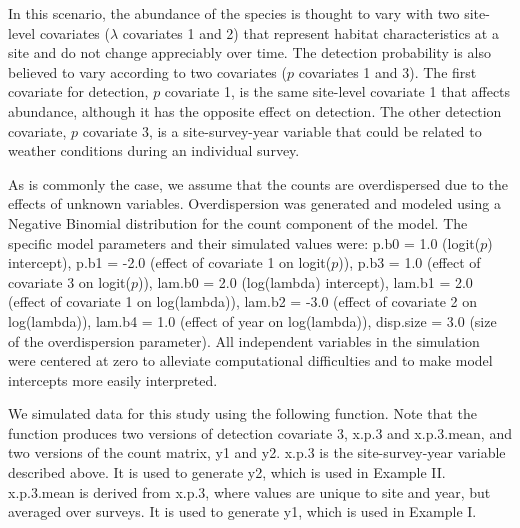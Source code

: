 \documentclass[article]{jss}
\begin{document}
In this scenario, the abundance of the species is thought to vary with two site-level covariates ($\lambda$ covariates 1 and 2) that represent habitat characteristics at a site and do not change appreciably over time. The detection probability is also believed to vary according to two covariates ($p$ covariates 1 and 3). The first covariate for detection, $p$ covariate 1, is the same site-level covariate 1 that affects abundance, although it has the opposite effect on detection. The other detection covariate, $p$ covariate 3, is a site-survey-year variable that could be related to weather conditions during an individual survey.

As is commonly the case, we assume that the counts are overdispersed due to the effects of unknown variables. Overdispersion was generated and modeled using a Negative Binomial distribution for the count component of the model. The specific model parameters and their simulated values were: p.b0 = 1.0 (logit($p$) intercept), p.b1 = -2.0 (effect of covariate 1 on logit($p$)), p.b3 = 1.0 (effect of covariate 3 on logit($p$)), lam.b0 = 2.0 (log(lambda) intercept), lam.b1 = 2.0 (effect of covariate 1 on log(lambda)), lam.b2 = -3.0 (effect of covariate 2 on log(lambda)), lam.b4 = 1.0 (effect of year on log(lambda)), disp.size = 3.0 (size of the overdispersion parameter). All independent variables in the simulation were centered at zero to alleviate computational difficulties and to make model intercepts more easily interpreted.

We simulated data for this study using the following function. Note that the function produces two versions of detection covariate 3, x.p.3 and x.p.3.mean, and two versions of the count matrix, y1 and y2. x.p.3 is the site-survey-year variable described above. It is used to generate y2, which is used in Example II. x.p.3.mean is derived from x.p.3, where values are unique to site and year, but averaged over surveys. It is used to generate y1, which is used in Example I.
\end{document}
